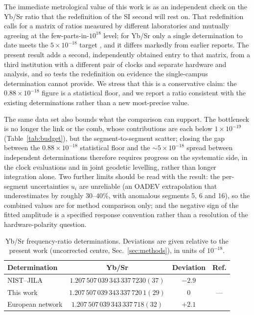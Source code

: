 \documentclass[11pt,a4paper]{article}
\newcommand{\e}[1]{\times 10^{#1}}
\begin{document}
The immediate metrological value of this work is as an independent check
on the Yb/Sr ratio that the redefinition of the SI second will rest on.
That redefinition calls for a matrix of ratios measured by different
laboratories and mutually agreeing at the few-parts-in-$10^{18}$ level;
for Yb/Sr only a single determination to date meets the $5\e{-18}$ target
\citep{aeppli2026nist}, and it differs markedly from earlier reports. The
present result adds a second, independently obtained entry to that
matrix, from a third institution with a different pair of clocks and
separate hardware and analysis, and so tests the redefinition on evidence
the single-campus determination cannot provide. We stress that this is a
conservative claim: the $0.88\e{-18}$ figure is a statistical floor, and
we report a ratio consistent with the existing determinations rather than
a new most-precise value.

The same data set also bounds what the comparison can support. The
bottleneck is no longer the link or the comb, whose contributions are each
below $1\e{-19}$ (Table~\ref{tab:budget}), but the segment-to-segment
scatter; closing the gap between the $0.88\e{-18}$ statistical floor and
the $\sim5\e{-18}$ spread between independent determinations therefore
requires progress on the systematic side, in the clock evaluations
\citep{zhu2026yb, jia2026sr} and in joint geodetic levelling, rather than
longer integration alone. Two further limits should be read with the
result: the per-segment uncertainties $u_i$ are unreliable (an OADEV
extrapolation that underestimates by roughly $30$--$40\%$, with anomalous
segments 5, 6 and 16), so the combined values are for method comparison
only; and the negative sign of the fitted amplitude is a specified
response convention rather than a resolution of the hardware-polarity
question.

\begin{table}[t]
  \centering
  \caption{Yb/Sr frequency-ratio determinations. Deviations are given
  relative to the present work (uncorrected centre, Sec.~\ref{sec:methods}),
  in units of $10^{-18}$.}
  \label{tab:compare}
  \begin{tabular}{lccc}
    \toprule
    Determination & Yb/Sr & Deviation & Ref. \\
    \midrule
    NIST--JILA       & $1.207\,507\,039\,343\,337\,7230(37)$ & $-2.9$ & \citep{aeppli2026nist} \\
    This work        & $1.207\,507\,039\,343\,337\,720\,1(29)$ & $0$    & --- \\
    European network & $1.207\,507\,039\,343\,337\,718(32)$  & $+2.1$ & \citep{pizzocaro2026european} \\
    \bottomrule
  \end{tabular}
\end{table}
\end{document}
